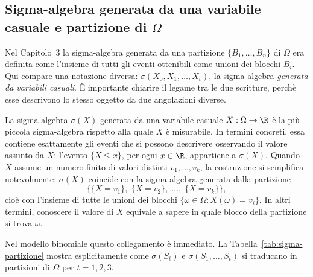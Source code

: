 \subsection{Sigma-algebra generata da una variabile casuale
e partizione di $\Omega$}

Nel Capitolo~3 la sigma-algebra generata da una partizione
$\{B_1,\ldots,B_n\}$ di $\Omega$ era definita come l'insieme di
tutti gli eventi ottenibili come unioni dei blocchi $B_i$. Qui
compare una notazione diversa: $\sigma(X_0,X_1,\ldots,X_t)$,
la sigma-algebra \emph{generata da variabili casuali}. \`{E}
importante chiarire il legame tra le due scritture, perch\`{e}
esse descrivono lo stesso oggetto da due angolazioni diverse.

La sigma-algebra $\sigma(X)$ generata da una variabile casuale
$X:\Omega\rightarrow\R$ \`{e} la pi\`{u} piccola sigma-algebra
rispetto alla quale $X$ \`{e} misurabile. In termini concreti,
essa contiene esattamente gli eventi che si possono descrivere
osservando il valore assunto da $X$: l'evento $\{X\leq x\}$, per
ogni $x\in\R$, appartiene a $\sigma(X)$. Quando $X$ assume un
numero finito di valori distinti $v_1,\ldots,v_k$, la costruzione
si semplifica notevolmente: $\sigma(X)$ coincide con la
sigma-algebra generata dalla partizione
\[
\bigl\{\{X=v_1\},\;\{X=v_2\},\;\ldots,\;\{X=v_k\}\bigr\},
\]
cio\`{e} con l'insieme di tutte le unioni dei blocchi
$\{\omega\in\Omega: X(\omega)=v_i\}$. In altri termini,
conoscere il valore di $X$ equivale a sapere in quale blocco
della partizione si trova $\omega$.

Nel modello binomiale questo collegamento \`{e} immediato.
La Tabella~\ref{tab:sigma-partizione} mostra esplicitamente
come $\sigma(S_t)$ e $\sigma(S_1,\ldots,S_t)$ si traducano
in partizioni di $\Omega$ per $t=1,2,3$.

